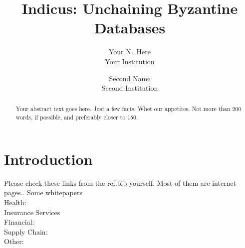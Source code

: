 \documentclass[letterpaper,twocolumn,10pt]{article}
\begin{document}

\date{}

\title{\Large \bf Indicus: Unchaining Byzantine Databases\\
 }

\author{
{\rm Your N.\ Here}\\
Your Institution
\and
{\rm Second Name}\\
Second Institution
} %

\maketitle

\begin{abstract}
Your abstract text goes here. Just a few facts. Whet our appetites.
Not more than 200 words, if possible, and preferably closer to 150.
\end{abstract}


\section{Introduction} 

Please check these links from the ref.bib yourself. Most of them are internet pages.. Some whitepapers\\
Health: \cite{HyperledgerHealth}\\
Insurance Services \cite{StateFarmQuorum, StateFarmQuorum2}\\
Financial: \cite{IBMSettlements, Libra}\\
Supply Chain:  \cite{IBMFoodSupply, SupplyExamples, DeloitteSupply}\\
Other: \cite{AutoInventory, HyperledgerTelecom}\\

%

%
%
%
%
\end{document}
